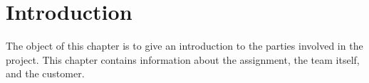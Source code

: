 \chapter{Introduction}
The object of this chapter is to give an introduction to the parties involved in the project. This chapter contains information about the assignment, the team itself, and the customer.






